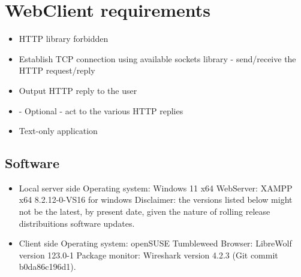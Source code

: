 \documentclass[11pt,a4paper]{report}
\begin{document}
    \section{WebClient requirements}
        \begin{itemize}
            \item HTTP library forbidden
            \item Establish TCP connection using available sockets library - send/receive the HTTP request/reply
            \item Output HTTP reply to the user
            \item - Optional - act to the various HTTP replies
            \item Text-only application
        \end{itemize}

    \subsection{Software}
        \begin{itemize}
            \item Local server side
                \subitem Operating system: Windows 11 x64
                \subitem WebServer: XAMPP x64 8.2.12-0-VS16 for windows
                Disclaimer: the versions listed below might not be the latest, by present date, given the nature of rolling release distribuitions software updates.
            \item Client side
                \subitem Operating system: openSUSE Tumbleweed
                \subitem Browser: LibreWolf version 123.0-1
                \subitem Package monitor: Wireshark version 4.2.3 (Git commit b0da86c196d1).
        \end{itemize}
\end{document}
